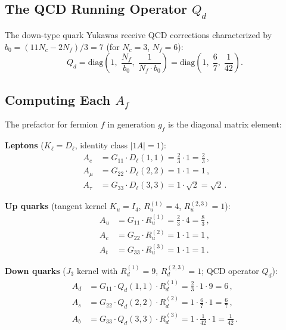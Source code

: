 \documentclass[11pt,a4paper]{article}
\begin{document}
\subsection{The QCD Running Operator $Q_d$}

The down-type quark Yukawas receive QCD corrections characterized by
$b_0 = (11N_c - 2N_f)/3 = 7$ (for $N_c=3$, $N_f=6$):
\begin{equation}
Q_d = \mathrm{diag}\!\left(1,\;\frac{N_f}{b_0},\;\frac{1}{N_f\cdot b_0}\right)
= \mathrm{diag}\!\left(1,\;\frac{6}{7},\;\frac{1}{42}\right).
\end{equation}


\subsection{Computing Each $A_f$}

The prefactor for fermion $f$ in generation $g_f$ is the diagonal matrix element:

\medskip
\noindent\textbf{Leptons} ($K_\ell = D_\ell$, identity class $|1A|=1$):
\begin{align}
A_e &= G_{11}\cdot D_\ell(1,1) = \tfrac{2}{3}\cdot 1 = \tfrac{2}{3}\,, \\
A_\mu &= G_{22}\cdot D_\ell(2,2) = 1\cdot 1 = 1\,, \\
A_\tau &= G_{33}\cdot D_\ell(3,3) = 1\cdot\sqrt{2} = \sqrt{2}\,.
\end{align}

\noindent\textbf{Up quarks} (tangent kernel $K_u = I_4$, $R_u^{(1)}=4$,
$R_u^{(2,3)}=1$):
\begin{align}
A_u &= G_{11}\cdot R_u^{(1)} = \tfrac{2}{3}\cdot 4 = \tfrac{8}{3}\,, \\
A_c &= G_{22}\cdot R_u^{(2)} = 1\cdot 1 = 1\,, \\
A_t &= G_{33}\cdot R_u^{(3)} = 1\cdot 1 = 1\,.
\end{align}

\noindent\textbf{Down quarks} ($J_3$ kernel with $R_d^{(1)}=9$,
$R_d^{(2,3)}=1$; QCD operator $Q_d$):
\begin{align}
A_d &= G_{11}\cdot Q_d(1,1)\cdot R_d^{(1)} = \tfrac{2}{3}\cdot 1\cdot 9 = 6\,, \\
A_s &= G_{22}\cdot Q_d(2,2)\cdot R_d^{(2)} = 1\cdot\tfrac{6}{7}\cdot 1 = \tfrac{6}{7}\,, \\
A_b &= G_{33}\cdot Q_d(3,3)\cdot R_d^{(3)} = 1\cdot\tfrac{1}{42}\cdot 1 = \tfrac{1}{42}\,.
\end{align}
\end{document}
